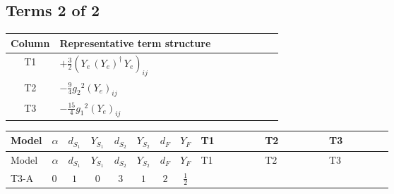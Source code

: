 \documentclass[8pt]{article}
\begin{document}
\begin{landscape}
\subsection*{Terms 2 of 2}
\begin{center}
\begin{tabular}{@{}c >{\raggedright\arraybackslash}p{0.82\linewidth}@{}}
\toprule
Column & Representative term structure \\
\midrule
T1 & \(\displaystyle +\frac{3}{2} \left({Y_e}\,\left({Y_e}\right)^{\dagger}\,{Y_e}\right)_{ij}\) \\
\midrule
T2 & \(\displaystyle -\frac{9}{4} {g_2}^2 \left({Y_e}\right)_{ij}\) \\
\midrule
T3 & \(\displaystyle -\frac{15}{4} {g_1}^2 \left({Y_e}\right)_{ij}\) \\
\midrule
\bottomrule
\end{tabular}
\end{center}
\smallskip
\tiny
\begin{longtable}{@{}llcccccc >{\raggedright\arraybackslash}p{0.21\linewidth} >{\raggedright\arraybackslash}p{0.21\linewidth} >{\raggedright\arraybackslash}p{0.21\linewidth}@{}}
\toprule
Model & $\alpha$ & $d_{S_1}$ & $Y_{S_1}$ & $d_{S_2}$ & $Y_{S_2}$ & $d_F$ & $Y_F$ & T1 & T2 & T3 \\
\midrule
\endfirsthead
\toprule
Model & $\alpha$ & $d_{S_1}$ & $Y_{S_1}$ & $d_{S_2}$ & $Y_{S_2}$ & $d_F$ & $Y_F$ & T1 & T2 & T3 \\
\midrule
\endhead
T3-A & $0$ & $1$ & $0$ & $3$ & $1$ & $2$ & $\frac{1}{2}$ & \scriptsize\adjustbox{max width=\linewidth}{$\begin{gathered} +\frac{3}{2} \left({Y_e}\,\left({Y_e}\right)^{\dagger}\,{Y_e}\right)_{ij}\end{gathered}$} & \scriptsize\adjustbox{max width=\linewidth}{$\begin{gathered} -\frac{9}{4} {g_2}^2 \left({Y_e}\right)_{ij}\end{gathered}$} & \scriptsize\adjustbox{max width=\linewidth}{$\begin{gathered} -\frac{15}{4} {g_1}^2 \left({Y_e}\right)_{ij}\end{gathered}$} \\
\midrule
\bottomrule
\end{longtable}
\clearpage

\end{landscape}
\end{document}
